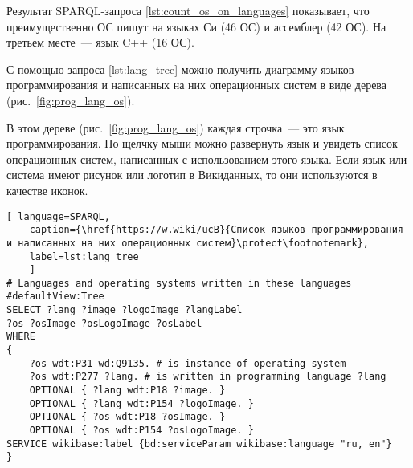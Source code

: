 Результат SPARQL-запроса \ref{lst:count_os_on_languages} показывает, 
что преимущественно ОС пишут на языках Си (46 ОС) и ассемблер (42 ОС). 
На третьем месте~--- язык C++ (16 ОС).

С помощью запроса \ref{lst:lang_tree} можно получить диаграмму языков программирования 
и написанных на них операционных систем в виде дерева (рис.~\ref{fig:prog_lang_os}).

\begin{marginfigure}[-5.0cm]
	{
		\setlength{\fboxsep}{0pt}%
		\setlength{\fboxrule}{1pt}%
	}
    \caption[Дерево языков программирования и написанных на них ОС.]{Дерево языков программирования и написанных на них операционных систем.}
	\label{fig:prog_lang_os}%
\end{marginfigure}

В этом дереве (рис.~\ref{fig:prog_lang_os}) каждая строчка~--- это язык программирования. 
По щелчку мыши можно развернуть язык и увидеть список операционных систем, 
написанных с использованием этого языка. 
Если язык или система имеют рисунок или логотип в Викиданных, 
то они используются в качестве иконок.


\begin{lstlisting}[ language=SPARQL, 
	caption={\href{https://w.wiki/ucB}{Список языков программирования и написанных на них операционных систем}\protect\footnotemark},
	label=lst:lang_tree
	]
# Languages and operating systems written in these languages
#defaultView:Tree
SELECT ?lang ?image ?logoImage ?langLabel 
?os ?osImage ?osLogoImage ?osLabel 
WHERE 
{
	?os wdt:P31 wd:Q9135. # is instance of operating system
	?os wdt:P277 ?lang. # is written in programming language ?lang
	OPTIONAL { ?lang wdt:P18 ?image. }
	OPTIONAL { ?lang wdt:P154 ?logoImage. }
	OPTIONAL { ?os wdt:P18 ?osImage. }
	OPTIONAL { ?os wdt:P154 ?osLogoImage. }
SERVICE wikibase:label {bd:serviceParam wikibase:language "ru, en"}
}
\end{lstlisting}


